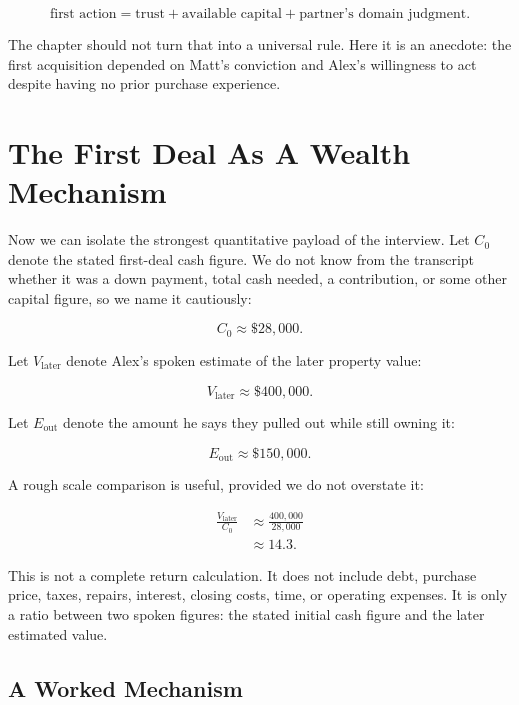 \begin{equation}
\text{first action}
=
\text{trust}
+
\text{available capital}
+
\text{partner's domain judgment}.
\end{equation}

The chapter should not turn that into a universal rule. Here it is an anecdote: the first acquisition depended on Matt's conviction and Alex's willingness to act despite having no prior purchase experience.

\section{The First Deal As A Wealth Mechanism}

Now we can isolate the strongest quantitative payload of the interview. Let \(C_0\) denote the stated first-deal cash figure. We do not know from the transcript whether it was a down payment, total cash needed, a contribution, or some other capital figure, so we name it cautiously:

\begin{equation}
C_0 \approx \$28{,}000.
\end{equation}

Let \(V_{\text{later}}\) denote Alex's spoken estimate of the later property value:

\begin{equation}
V_{\text{later}} \approx \$400{,}000.
\end{equation}

Let \(E_{\text{out}}\) denote the amount he says they pulled out while still owning it:

\begin{equation}
E_{\text{out}} \approx \$150{,}000.
\end{equation}

A rough scale comparison is useful, provided we do not overstate it:

\begin{align}
\frac{V_{\text{later}}}{C_0}
&\approx
\frac{400{,}000}{28{,}000} \\
&\approx 14.3.
\end{align}

This is not a complete return calculation. It does not include debt, purchase price, taxes, repairs, interest, closing costs, time, or operating expenses. It is only a ratio between two spoken figures: the stated initial cash figure and the later estimated value.

\subsection{A Worked Mechanism}

